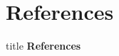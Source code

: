 \section*{References}
\begin{frame}{\hspace{3cm}}
\centering

\vspace{1.5cm}

\begin{beamercolorbox}[sep=20pt,center,rounded=true,shadow=true]{title}
    {\fontsize{20}{24}\selectfont \textbf{References}}
\end{beamercolorbox}

\vspace{0.8cm}


\vfill

\end{frame}
